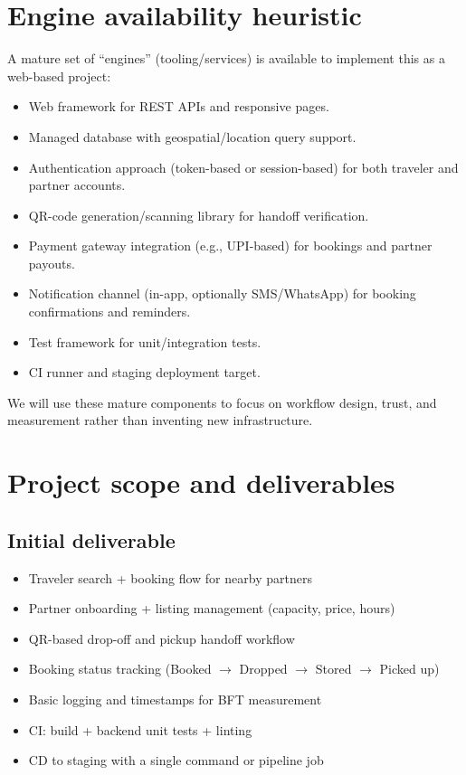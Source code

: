 \documentclass[11pt,a4paper]{article}
\begin{document}
\section{Engine availability heuristic}
A mature set of ``engines'' (tooling/services) is available to implement this as a web-based project:
\begin{itemize}[leftmargin=0.7cm]
    \item Web framework for REST APIs and responsive pages.
    \item Managed database with geospatial/location query support.
    \item Authentication approach (token-based or session-based) for both traveler and partner accounts.
    \item QR-code generation/scanning library for handoff verification.
    \item Payment gateway integration (e.g., UPI-based) for bookings and partner payouts.
    \item Notification channel (in-app, optionally SMS/WhatsApp) for booking confirmations and reminders.
    \item Test framework for unit/integration tests.
    \item CI runner and staging deployment target.
\end{itemize}
We will use these mature components to focus on workflow design, trust, and measurement rather than inventing new infrastructure.

\section{Project scope and deliverables}
\subsection{Initial deliverable}
\begin{itemize}[leftmargin=0.7cm]
    \item Traveler search + booking flow for nearby partners
    \item Partner onboarding + listing management (capacity, price, hours)
    \item QR-based drop-off and pickup handoff workflow
    \item Booking status tracking (Booked $\rightarrow$ Dropped $\rightarrow$ Stored $\rightarrow$ Picked up)
    \item Basic logging and timestamps for BFT measurement
    \item CI: build + backend unit tests + linting
    \item CD to staging with a single command or pipeline job
\end{itemize}
\end{document}
